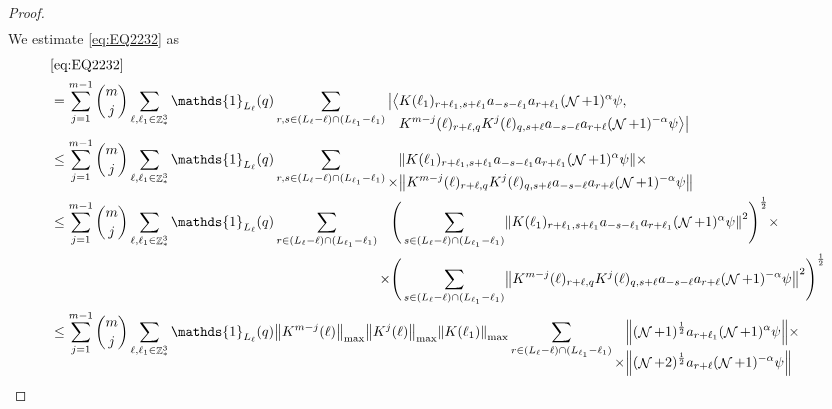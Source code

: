 \documentclass[sn-mathphys, Numbered ,a4paper]{sn-jnl}%
\DeclareMathOperator{\Z}{\mathbb{Z}}
\DeclareMathOperator{\NN}{\mathcal{N}}
\newcommand{\half}{\frac{1}{2}}
\theoremstyle{plain}
\theoremstyle{definition}
\theoremstyle{remark}
\theoremstyle{plain}
\theoremstyle{definition}
\theoremstyle{remark}
\begin{document}
\begin{proof}
\begin{align}
	\end{align}  
	We estimate \eqref{eq:EQ2232} as
	\begin{align}
		&\eqref{eq:EQ2232}\nonumber\\
		&=\sum\limits_{j=1}^{m-1} {{m}\choose j} \sum\limits_{\ell, \ell_1\in \Z^3_*}\mathds{1}_{L_{\ell}}(q) \sum\limits_{r, s \in (L_{\ell}-\ell) \cap (L_{\ell_1}-\ell_1)} \begin{aligned}[t] \big|\big<&K(\ell_1)_{r+\ell_1,s+\ell_1}a_{-s-\ell_1} a_{r+\ell_1} (\NN+1)^{\alpha} \psi,\nonumber\\  &K^{m-j}(\ell)_{r+\ell,q} K^{j}(\ell)_{q,s+\ell} a_{-s-\ell} a_{r+\ell}  (\NN+1)^{-\alpha} \psi\big>\big| \end{aligned} 
		\nonumber\\
		&\leq \sum\limits_{j=1}^{m-1} {{m}\choose j} \sum\limits_{\ell, \ell_1\in \Z^3_*}\mathds{1}_{L_{\ell}}(q) \sum\limits_{r, s \in (L_{\ell}-\ell) \cap (L_{\ell_1}-\ell_1)} \begin{aligned}[t] &\norm{ K(\ell_1)_{r+\ell_1,s+\ell_1}a_{-s-\ell_1} a_{r+\ell_1} (\NN+1)^{\alpha}\psi}\nonumber \times \\ \times&\norm{ K^{m-j}(\ell)_{r+\ell,q} K^{j}(\ell)_{q,s+\ell} a_{-s-\ell}a_{r+\ell} (\NN+1)^{-\alpha} \psi }\end{aligned} \nonumber\\
		&\leq \sum\limits_{j=1}^{m-1} {{m}\choose j} \sum\limits_{\ell, \ell_1\in \Z^3_*} \mathds{1}_{L_{\ell}}(q) \sum\limits_{r\in(L_{\ell}-\ell) \cap (L_{\ell_1}-\ell_1)}   \begin{aligned}[t] \Bigg(\sum\limits_{ s \in (L_{\ell}-\ell) \cap (L_{\ell_1}-\ell_1)}&\norm{ K(\ell_1)_{r+\ell_1,s+\ell_1}a_{-s-\ell_1} a_{r+\ell_1} (\NN+1)^{\alpha}\psi}^2\Bigg)^\half\nonumber \times \\ \times\Bigg(  \sum\limits_{ s \in (L_{\ell}-\ell) \cap (L_{\ell_1}-\ell_1)}&\norm{ K^{m-j}(\ell)_{r+\ell,q} K^{j}(\ell)_{q,s+\ell} a_{-s-\ell}a_{r+\ell} (\NN+1)^{-\alpha} \psi }^2\Bigg)^\half\end{aligned} \nonumber\\
		&\leq \sum\limits_{j=1}^{m-1} {{m}\choose j} \sum\limits_{\ell, \ell_1\in \Z^3_*} \mathds{1}_{L_{\ell}}(q) \norm{K^{m-j}(\ell)}_{\mathrm{max}} \norm{K^{j}(\ell)}_{\mathrm{max}} \norm{ K(\ell_1)}_{\mathrm{max}} \sum\limits_{r\in(L_{\ell}-\ell) \cap (L_{\ell_1}-\ell_1)} \begin{aligned}[t] &\norm{(\NN+1)^\half a_{r+\ell_1} (\NN+1)^{\alpha}\psi}\nonumber \times \\ \times&\norm{   (\NN+2)^\half a_{r+\ell} (\NN+1)^{-\alpha} \psi }\end{aligned} \nonumber

\end{align}
\end{proof}
\end{document}
